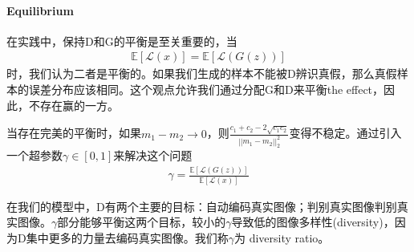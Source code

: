             \paragraph{Equilibrium}在实践中，保持D和G的平衡是至关重要的，当
            \begin{align*}
            \mathbb{E}[\mathcal{L}(x)] = \mathbb{E}[\mathcal{L}(G(z))]
            \end{align*}
            时，我们认为二者是平衡的。如果我们生成的样本不能被D辨识真假，那么真假样本的误差分布应该相同。这个观点允许我们通过分配G和D来平衡the effect，因此，不存在赢的一方。
            \par
            当存在完美的平衡时，如果$m_1-m_2\to 0$，则$\frac{c_1+c_2-2\sqrt{c_1c_2}}{||m_1-m_2||_2^2}$变得不稳定。通过引入一个超参数$\gamma\in [0,1]$来解决这个问题
            \begin{align*}
            \gamma = \frac{\mathbb{E}[\mathcal{L}(G(z))]}{\mathbb{E}[\mathcal{L}(x)] }
            \end{align*}
            \par
            在我们的模型中，D有两个主要的目标：自动编码真实图像；判别真实图像判别真实图像。$\gamma$部分能够平衡这两个目标，较小的$\gamma$导致低的图像多样性(diversity)，因为D集中更多的力量去编码真实图像。我们称$\gamma$为 diversity ratio。

